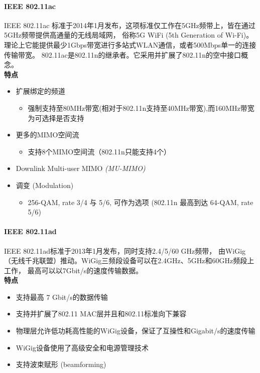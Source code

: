 \documentclass[11pt]{article}
\begin{document}
\paragraph{IEEE 802.11ac}
IEEE 802.11ac 标准于2014年1月发布，这项标准仅工作在5GHz频带上，皆在通过5GHz频带提供高通量的无线局域网，
俗称5G WiFi (5th Generation of Wi-Fi)。理论上它能提供最少1Gbps带宽进行多站式WLAN通信，或者500Mbps单一的连接传输带宽。
802.11ac是802.11n的继承者。它采用并扩展了802.11n的空中接口概念。
\\
\textbf{特点}
\begin{itemize}
    \item 扩展绑定的频道
    \begin{itemize}
        \item  强制支持至80MHz带宽(相对于802.11n支持至40MHz带宽),而160MHz带宽为可选择是否支持
    \end{itemize}
    \item 更多的MIMO空间流
    \begin{itemize}
        \item 支持8个MIMO空间流（802.11n只能支持4个）
    \end{itemize}
    \item Downlink Multi-user MIMO \textit{(MU-MIMO)}
    \item 调变 (Modulation)
    \begin{itemize}
        \item 256-QAM, rate 3/4 与 5/6, 可作为选项 (802.11n 最高到达 64-QAM, rate 5/6) 
    \end{itemize}
\end{itemize}
\paragraph{IEEE 802.11ad}
IEEE 802.11ad标准于2013年1月发布，同时支持2.4/5/60 GHz频带，
由WiGig（无线千兆联盟）推动。WiGig三频段设备可以在2.4GHz、5GHz和60GHz频段上工作，
最高可以以7Gbit/s的速度传输数据。
\\
\textbf{特点}
\begin{itemize}
    \item 支持最高 7 Gbit/s的数据传输
    \item 支持并扩展了802.11 MAC层并且和802.11标准向下兼容
    \item 物理层允许低功耗高性能的WiGig设备，保证了互操性和Gigabit/s的速度传输
    \item WiGig设备使用了高级安全和电源管理技术
    \item 支持波束赋形 (beamforming)
\end{itemize}
\end{document}
